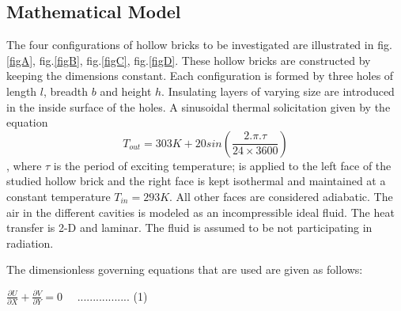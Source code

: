 \documentclass{article}
\begin{document}
\begin{multicols}{2}

\section{Mathematical Model}
The four configurations of hollow bricks to be investigated are illustrated in fig.\ref{figA}, fig.\ref{figB}, fig.\ref{figC}, fig.\ref{figD}. These hollow bricks are constructed by keeping the dimensions constant. Each configuration is formed by three holes of length $l$, breadth $b$ and height $h$. Insulating layers of varying size are introduced in the inside surface of the holes. A sinusoidal thermal solicitation given by the equation $$T_{out} = 303K + 20sin\left(\frac{2.\pi.\tau}{24 \times 3600}\right)$$, where $\tau$ is the period of exciting temperature; is applied to the left face of the studied hollow brick and the right face is kept isothermal and maintained at a constant temperature $T_{in} = 293K$. All other faces are considered adiabatic. The air in the different cavities is modeled as an incompressible ideal fluid. The heat transfer is 2-D and laminar. The fluid is assumed to be not participating in radiation. 

The dimensionless governing equations that are used are given as follows: \\

\end{multicols}









\begin{center}
  $   \frac{\partial U}{\partial X} + \frac{\partial V}{\partial Y} = 0 $        \qquad\qquad \qquad\qquad\qquad\qquad\quad\quad\quad \quad\quad \quad \quad \quad   \  \ ................. (1) \\
 \end{center}    
\end{document}
